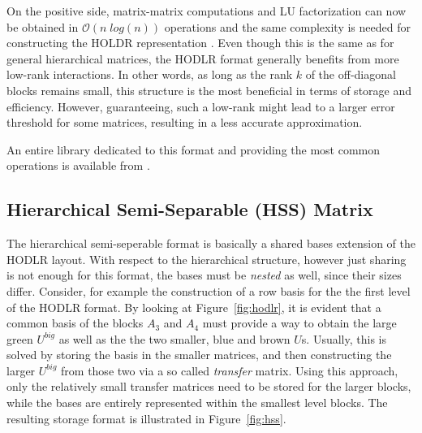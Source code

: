 On the positive side, matrix-matrix computations and LU factorization can now be obtained in $\mathcal{O}(n\; log(n))$ operations and the same complexity is needed for constructing the HOLDR representation \cite{ambikasaran_fast_2016}. Even though this is the same as for general hierarchical matrices, the HODLR format generally benefits from more low-rank interactions. In other words, as long as the rank $k$ of the off-diagonal blocks remains small, this structure is the most beneficial in terms of storage and efficiency. However, guaranteeing, such a low-rank might lead to a larger error threshold for some matrices, resulting in a less accurate approximation.

An entire library dedicated to this format and providing the most common operations is available from \cite{ambikasaran_hodlrlib_2019}.


\subsection{Hierarchical Semi-Separable (HSS) Matrix}
\label{sec:hss}

The hierarchical semi-seperable format is basically a shared bases extension of the HODLR layout. With respect to the hierarchical structure, however just sharing is not enough for this format, the bases must be \textit{nested} as well, since their sizes differ. Consider, for example the construction of a row basis for the the first level of the HODLR format. By looking at Figure~\hyperref[fig:hodlr]{\ref{fig:hodlr}}, it is evident that a common basis of the blocks $A_3$ and $A_4$ must provide a way to obtain the large green $U^{big}$ as well as the the two smaller, blue and brown $U$s. Usually, this is solved by storing the basis in the smaller matrices, and then constructing the larger $U^{big}$ from those two via a so called \textit{transfer} matrix. Using this approach, only the relatively small transfer matrices need to be stored for the larger blocks, while the bases are entirely represented within the smallest level blocks. The resulting storage format is illustrated in Figure~\hyperref[fig:hss]{\ref{fig:hss}}.


